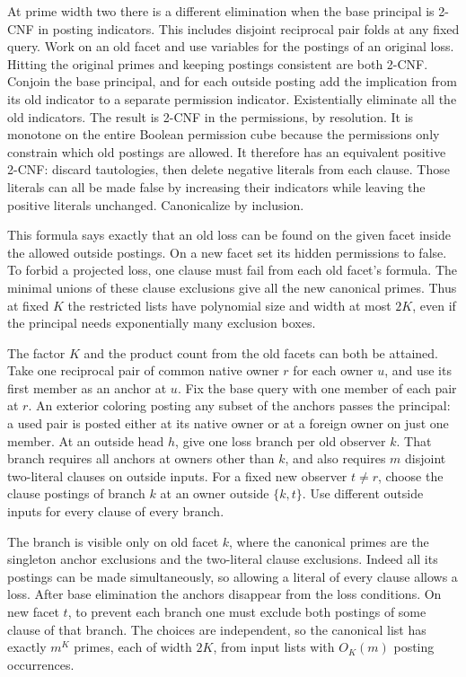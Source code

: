 At prime width two there is a different elimination when the
base principal is 2-CNF in posting indicators. This includes
disjoint reciprocal pair folds at any fixed query. Work on an
old facet and use variables for the postings of an original
loss. Hitting the original primes and keeping postings
consistent are both 2-CNF. Conjoin the base principal, and
for each outside posting add the implication from its old
indicator to a separate permission indicator. Existentially
eliminate all the old indicators. The result is 2-CNF in the
permissions, by resolution. It is monotone on the entire
Boolean permission cube because the permissions only constrain
which old postings are allowed. It therefore has an equivalent
positive 2-CNF: discard tautologies, then delete negative
literals from each clause. Those literals can all be made
false by increasing their indicators while leaving the
positive literals unchanged. Canonicalize by inclusion.

This formula says exactly that an old loss can be found on
the given facet inside the allowed outside postings. On a
new facet set its hidden permissions to false. To forbid a
projected loss, one clause must fail from each old facet's
formula. The minimal unions of these clause exclusions give
all the new canonical primes. Thus at fixed $K$ the restricted
lists have polynomial size and width at most $2K$, even if
the principal needs exponentially many exclusion boxes.

The factor $K$ and the product count from the old facets can
both be attained. Take one reciprocal pair of common native
owner $r$ for each owner $u$, and use its first member as
an anchor at $u$. Fix the base query with one member of each
pair at $r$. An exterior coloring posting any subset of the
anchors passes the principal: a used pair is posted either
at its native owner or at a foreign owner on just one member.
At an outside head $h$, give one loss branch per old observer
$k$. That branch requires all anchors at owners other than
$k$, and also requires $m$ disjoint two-literal clauses on
outside inputs. For a fixed new observer $t\ne r$, choose the
clause postings of branch $k$ at an owner outside $\{k,t\}$.
Use different outside inputs for every clause of every branch.

The branch is visible only on old facet $k$, where the
canonical primes are the singleton anchor exclusions and
the two-literal clause exclusions. Indeed all its postings
can be made simultaneously, so allowing a literal of every
clause allows a loss. After base elimination the anchors
disappear from the loss conditions. On new facet $t$, to
prevent each branch one must exclude both postings of some
clause of that branch. The choices are independent, so the
canonical list has exactly $m^K$ primes, each of width $2K$,
from input lists with $O_K(m)$ posting occurrences.

